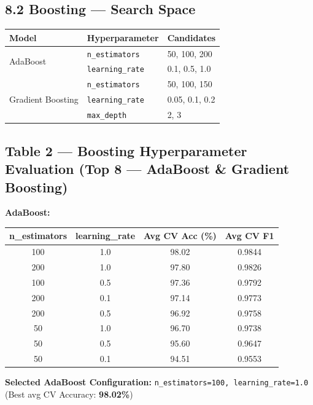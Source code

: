 \documentclass[12pt,a4paper]{article}
\begin{document}
\subsection*{8.2 Boosting — Search Space}

\begin{center}
\begin{tabular}{lll}
\toprule
\textbf{Model}        & \textbf{Hyperparameter}  & \textbf{Candidates} \\
\midrule
\multirow{2}{*}{AdaBoost} & \texttt{n\_estimators} & 50, 100, 200 \\
                           & \texttt{learning\_rate}& 0.1, 0.5, 1.0 \\
\midrule
\multirow{3}{*}{Gradient Boosting} & \texttt{n\_estimators} & 50, 100, 150 \\
                                   & \texttt{learning\_rate}& 0.05, 0.1, 0.2 \\
                                   & \texttt{max\_depth}    & 2, 3 \\
\bottomrule
\end{tabular}
\end{center}

\subsection*{Table 2 — Boosting Hyperparameter Evaluation (Top 8 — AdaBoost \& Gradient Boosting)}

\textbf{AdaBoost:}
\begin{center}
\begin{tabular}{cccc}
\toprule
\textbf{n\_estimators} & \textbf{learning\_rate}
  & \textbf{Avg CV Acc (\%)} & \textbf{Avg CV F1} \\
\midrule
100 & 1.0 & 98.02 & 0.9844 \\
200 & 1.0 & 97.80 & 0.9826 \\
100 & 0.5 & 97.36 & 0.9792 \\
200 & 0.1 & 97.14 & 0.9773 \\
200 & 0.5 & 96.92 & 0.9758 \\
50  & 1.0 & 96.70 & 0.9738 \\
50  & 0.5 & 95.60 & 0.9647 \\
50  & 0.1 & 94.51 & 0.9553 \\
\bottomrule
\end{tabular}
\end{center}

\textbf{Selected AdaBoost Configuration:}
\texttt{n\_estimators=100, learning\_rate=1.0}
(Best avg CV Accuracy: \textbf{98.02\%})
\end{document}

